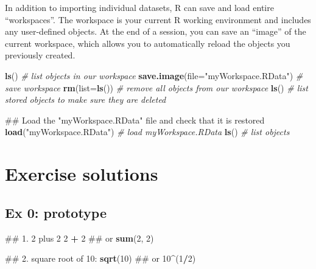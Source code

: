\documentclass[]{book}
\newenvironment{Shaded}{\begin{snugshade}}{\end{snugshade}}
\newcommand{\KeywordTok}[1]{\textcolor[rgb]{0.13,0.29,0.53}{\textbf{#1}}}
\newcommand{\DataTypeTok}[1]{\textcolor[rgb]{0.13,0.29,0.53}{#1}}
\newcommand{\DecValTok}[1]{\textcolor[rgb]{0.00,0.00,0.81}{#1}}
\newcommand{\StringTok}[1]{\textcolor[rgb]{0.31,0.60,0.02}{#1}}
\newcommand{\CommentTok}[1]{\textcolor[rgb]{0.56,0.35,0.01}{\textit{#1}}}
\newcommand{\OperatorTok}[1]{\textcolor[rgb]{0.81,0.36,0.00}{\textbf{#1}}}
\newcommand{\NormalTok}[1]{#1}
\begin{document}
In addition to importing individual datasets, R can save and load entire
``workspaces''. The workspace is your current R working environment and
includes any user-defined objects. At the end of a session, you can save
an ``image'' of the current workspace, which allows you to automatically
reload the objects you previously created.

\begin{Shaded}
\begin{Highlighting}[]
\KeywordTok{ls}\NormalTok{() }\CommentTok{# list objects in our workspace}
\KeywordTok{save.image}\NormalTok{(}\DataTypeTok{file=}\StringTok{"myWorkspace.RData"}\NormalTok{) }\CommentTok{# save workspace }
\KeywordTok{rm}\NormalTok{(}\DataTypeTok{list=}\KeywordTok{ls}\NormalTok{()) }\CommentTok{# remove all objects from our workspace }
\KeywordTok{ls}\NormalTok{() }\CommentTok{# list stored objects to make sure they are deleted}
\end{Highlighting}
\end{Shaded}

\begin{Shaded}
\begin{Highlighting}[]
\NormalTok{## Load the "myWorkspace.RData" file and check that it is restored}
\KeywordTok{load}\NormalTok{(}\StringTok{"myWorkspace.RData"}\NormalTok{) }\CommentTok{# load myWorkspace.RData}
\KeywordTok{ls}\NormalTok{() }\CommentTok{# list objects}
\end{Highlighting}
\end{Shaded}

\section{Exercise solutions}\label{exercise-solutions}

\subsection{Ex 0: prototype}\label{ex-0-prototype}

\begin{Shaded}
\begin{Highlighting}[]
\NormalTok{## 1. 2 plus 2}
\DecValTok{2} \OperatorTok{+}\StringTok{ }\DecValTok{2}
\NormalTok{## or}
\KeywordTok{sum}\NormalTok{(}\DecValTok{2}\NormalTok{, }\DecValTok{2}\NormalTok{)}
\end{Highlighting}
\end{Shaded}

\begin{Shaded}
\begin{Highlighting}[]
\NormalTok{## 2. square root of 10:}
\KeywordTok{sqrt}\NormalTok{(}\DecValTok{10}\NormalTok{)}
\NormalTok{## or}
\DecValTok{10}\OperatorTok{^}\NormalTok{(}\DecValTok{1}\OperatorTok{/}\DecValTok{2}\NormalTok{)}
\end{Highlighting}
\end{Shaded}
\end{document}
